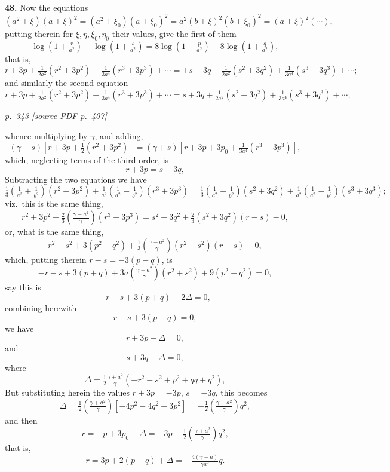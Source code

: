 \documentclass[11pt,a4paper]{article}
\newcommand{\pagemarker}[2]{\par\bigskip\noindent\textit{p.~#1 [source PDF p.~#2]}\par\smallskip}
\begin{document}
\textbf{48.} Now the equations
\[
(a^2 + \xi)(a + \xi)^2 = (a^2 + \xi_0)(a + \xi_0)^2 = a^2(b + \xi)^2(b + \xi_0)^2 = (a + \xi)^2(\cdots),
\]
putting therein for $\xi, \eta, \xi_0, \eta_0$ their values, give the first of them
\[
\log\!\left(1 + \tfrac{r}{a^2}\right) - \log\!\left(1 + \tfrac{s}{a^2}\right) = 8\log\!\left(1 + \tfrac{p}{a^2}\right) - 8\log\!\left(1 + \tfrac{q}{a^2}\right),
\]
that is,
\[
r + 3p + \tfrac{1}{2a^2}(r^2 + 3p^2) + \tfrac{1}{3a^4}(r^3 + 3p^3) + \cdots = +s + 3q + \tfrac{1}{2a^2}(s^2 + 3q^2) + \tfrac{1}{3a^4}(s^3 + 3q^3) + \cdots ;
\]
and similarly the second equation
\[
r + 3p + \tfrac{1}{2a^2}(r^2 + 3p^2) + \tfrac{1}{3a^4}(r^3 + 3p^3) + \cdots = s + 3q + \tfrac{1}{2a^2}(s^2 + 3q^2) + \tfrac{1}{3a^4}(s^3 + 3q^3) + \cdots;
\]

\clearpage

\bigskip
\pagemarker{343}{407}
\smallskip

whence multiplying by $\gamma$, and adding,
\[
(\gamma + s)\!\left[r + 3p + \tfrac{1}{2}(r^2 + 3p^2)\right] = (\gamma + s)\!\left[r + 3p + 3p_0 + \tfrac{1}{3a^4}(r^3 + 3p^3)\right],
\]
which, neglecting terms of the third order, is
\[
r + 3p = s + 3q,
\]
Subtracting the two equations we have
\[
\tfrac{1}{3}\!\left(\tfrac{1}{a^2} + \tfrac{1}{b^2}\right)(r^2 + 3p^2) + \tfrac{1}{a^2}\!\left(\tfrac{1}{a^2} - \tfrac{1}{b^2}\right)(r^3 + 3p^3) = \tfrac{1}{3}\!\left(\tfrac{1}{a^2} + \tfrac{1}{b^2}\right)(s^2 + 3q^2) + \tfrac{1}{a^2}\!\left(\tfrac{1}{a^2} - \tfrac{1}{b^2}\right)(s^3 + 3q^3);
\]
viz.\ this is the same thing,
\[
r^2 + 3p^2 + \tfrac{2}{3}\!\left(\tfrac{\gamma - a^2}{\gamma}\right)\!(r^3 + 3p^3) = s^2 + 3q^2 + \tfrac{2}{3}(s^2 + 3q^2)(r - s) - 0,
\]
or, what is the same thing,
\[
r^2 - s^2 + 3(p^2 - q^2) + \tfrac{1}{3}\!\left(\tfrac{\gamma - a^2}{\gamma}\right)\!(r^2 + s^2)(r - s) - 0,
\]
which, putting therein $r - s = -3(p - q)$, is
\[
-r - s + 3(p + q) + 3a\!\left(\tfrac{\gamma - a^2}{\gamma}\right)\!(r^2 + s^2) + 9(p^2 + q^2) = 0,
\]
say this is
\[
-r - s + 3(p + q) + 2\Delta = 0,
\]
combining herewith
\[
r - s + 3(p - q) = 0,
\]
we have
\[
r + 3p - \Delta = 0,
\]
and
\[
s + 3q - \Delta = 0,
\]
where
\[
\Delta = \tfrac{1}{2}\tfrac{\gamma + a^2}{\gamma}(-r^2 - s^2 + p^2 + qq + q^2),
\]
But substituting herein the values $r + 3p = -3p$, $s = -3q$, this becomes
\[
\Delta = \tfrac{1}{2}\!\left(\tfrac{\gamma + a^2}{\gamma}\right)\!\!\left[-4p^2 - 4q^2 - 3p^2\right] = -\tfrac{1}{2}\!\left(\tfrac{\gamma + a^2}{\gamma}\right)\!q^2,
\]
and then
\[
r = -p + 3p_0 + \Delta = -3p - \tfrac{1}{2}\!\left(\tfrac{\gamma + a^2}{\gamma}\right)\!q^2,
\]
that is,
\[
r = 3p + 2(p + q) + \Delta = -\tfrac{4(\gamma - a)}{\gamma a^2}q.
\]
\end{document}
